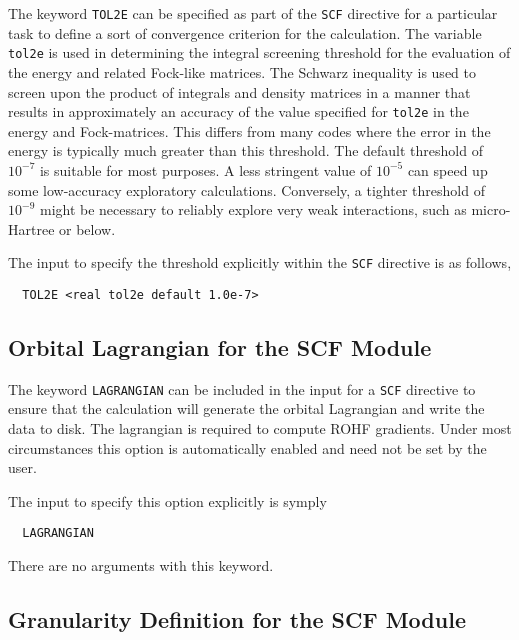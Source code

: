 The keyword \verb+TOL2E+ can be specified as part of the \verb+SCF+ 
directive for a particular task to define a sort of convergence
criterion for the calculation.  
The variable \verb+tol2e+ is used in determining the integral screening 
threshold for the
evaluation of the energy and related Fock-like matrices.  The Schwarz
inequality is used to screen upon the product of integrals and density
matrices in a manner that results in approximately an accuracy of 
the value specified for
\verb+tol2e+ in the energy and Fock-matrices.  This differs from many
codes where the error in the energy is typically much greater than
this threshold.  The default threshold of $10^{-7}$ is suitable for most 
purposes.
A less stringent value of $10^{-5}$ can speed up some low-accuracy 
exploratory calculations.  Conversely, a tighter threshold of 
$10^{-9}$ might be
necessary to reliably explore very weak
interactions, such as micro-Hartree or below.

The input to specify the threshold explicitly within the
\verb+SCF+ directive is as follows,

\begin{verbatim}
  TOL2E <real tol2e default 1.0e-7>
\end{verbatim}


\subsection{Orbital Lagrangian for the SCF Module}



The keyword \verb+LAGRANGIAN+ can be included in the input for a
\verb+SCF+ directive to ensure that the calculation will generate
the orbital Lagrangian and write the data to disk. The
lagrangian is required to compute ROHF gradients.  Under most
circumstances this option is automatically enabled and need not be set
by the user.

The input to specify this option explicitly is symply
\begin{verbatim}
  LAGRANGIAN
\end{verbatim}

There are no arguments with this keyword.

\subsection{Granularity Definition for the SCF Module}

